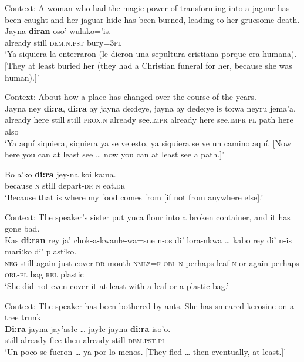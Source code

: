 \begin{exe}
	\ex\label{exAppendixMovimaAtLeast1}
	Context: A woman who had the magic power of transforming into a jaguar has been caught and her jaguar hide has been burned, leading to her gruesome death.\\
	\gll Jayna \textbf{diran} oso' wulako='is.\\
	already still \textsc{dem}.\textsc{n}.\textsc{pst} bury=3\textsc{pl}\\
	\glt \lq Ya siquiera la enterraron (le dieron una sepultura cristiana porque era humana). [They at least buried her (they had a Christian funeral for her, because she was human).]\rq{ }\parencite{MovimaCorpus}
	
	\ex\label{exAppendixMovimaAtLeast2}
	Context: About how a place has changed over the course of the years.\\
	\gll Jayna ney \textbf{di:ra}, \textbf{di:ra} ay jayna de:deye, jayna ay dede:ye is to:wa neyru jema'a.\\
	already here still still \textsc{prox}.\textsc{n} already see.\textsc{impr} already here see.\textsc{impr} \textsc{pl} path here also\\
	\glt \lq Ya aquí siquiera, siquiera ya se ve esto, ya siquiera se ve un camino aquí. [Now here you can at least see … now you can at least see a path.]\rq{ }\parencite{MovimaCorpus}
		
	\ex\label{exAppendixMovimaAtLeast3}
	\gll Bo a’ko \textbf{di:ra} jey-na koi ka:na.\\
	because \textsc{n} still depart-\textsc{dr} \textsc{n} eat.\textsc{dr}\\
	\glt \lq Because that is where my food comes from [if not from anywhere else].' \parencite[521]{Haude2006}	
	
	\ex\label{exAppendixMovimaAtLeast4}
	Context: The speaker's sister put yuca flour into a broken container, and it has gone bad.\\
	\gll Kas \textbf{di:ran} rey ja' chok-a-kwanɬe-wa=sne n-os di'  lora-nkwa … kabo rey di' n-is mariːko di' plastiko.\\
	\textsc{neg} still again just cover-\textsc{dr}-mouth-\textsc{nmlz}=\textsc{f} \textsc{obl}-\textsc{n} perhaps leaf-\textsc{n} {} or  again perhaps \textsc{obl}-\textsc{pl} bag \textsc{rel} plastic\\
	\glt \lq  She did not even cover it at least with a leaf or a plastic bag.\rq{ }\parencite[530]{Haude2006}
	
	\ex\label{exAppendixMovimaAtLeast5}
	Context: The speaker has been bothered by ants. She has smeared kerosine on a tree trunk\\
	\gll \textbf{Di:ra} jayna jay'asłe … jayłe jayna \textbf{di:ra} iso'o.\\
	still already flee {} then already still \textsc{dem}.\textsc{pst}.\textsc{pl}\\
	\glt \lq Un poco se fueron … ya por lo menos. [They fled … then eventually, at least.]\rq{ }\parencite{MovimaCorpus}
\end{exe}

